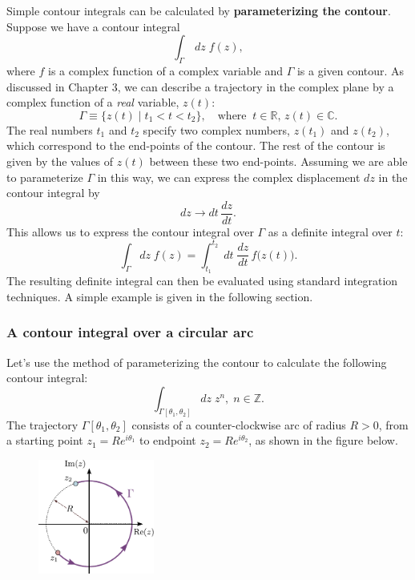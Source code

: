 \documentclass[10pt,a4paper]{article}
\begin{document}
Simple contour integrals can be calculated by \textbf{parameterizing
  the contour}. Suppose we have a contour integral
\begin{equation}
\int_\Gamma \, dz \; f(z),
\end{equation}
where $f$ is a complex function of a complex variable and $\Gamma$ is
a given contour. As discussed in Chapter 3, we can describe a
trajectory in the complex plane by a complex function of a \emph{real}
variable, $z(t)$:
\begin{equation}
\Gamma \equiv \Big\{z(t) \;\Big|\; t_1 < t < t_2\Big\}, \quad \mathrm{where}\;\; t \in \mathbb{R}, \,z(t) \in \mathbb{C}.
\end{equation}
The real numbers $t_1$ and $t_2$ specify two complex numbers,
$z(t_1)$ and $z(t_2)$, which correspond to the end-points of the
contour. The rest of the contour is given by the values of $z(t)$
between these two end-points. Assuming we are able to parameterize
$\Gamma$ in this way, we can express the complex displacement $dz$
in the contour integral by
\begin{equation}
dz \rightarrow dt\, \frac{dz}{dt}.
\end{equation}
This allows us to express the contour integral over $\Gamma$ as a
definite integral over $t$:
\begin{equation}
\int_\Gamma dz\; f(z) = \int_{t_1}^{t_2} \; dt\; \frac{dz}{dt}\, f\Big(z(t)\Big).
\end{equation}
The resulting definite integral can then be evaluated using standard
integration techniques. A simple example is given in the following
section.

\subsubsection{A contour integral over a circular arc}
\label{a-contour-integral-over-a-circular-arc}

Let's use the method of parameterizing the contour to calculate the
following contour integral:
\begin{equation}
 \int_{\Gamma[\theta_1,\theta_2]} dz\; z^n,\; n\in\mathbb{Z}.
\end{equation}
The trajectory $\Gamma[\theta_1,\theta_2]$ consists of a
counter-clockwise arc of radius $R > 0$, from a starting point $z_1 =
R e^{i\theta_1}$ to endpoint $z_2 = R e^{i\theta_2}$, as shown in the
figure below.

\begin{figure}[h]
  \centering\includegraphics[width=0.34\textwidth]{complex_integral_example}
\end{figure}
\end{document}
